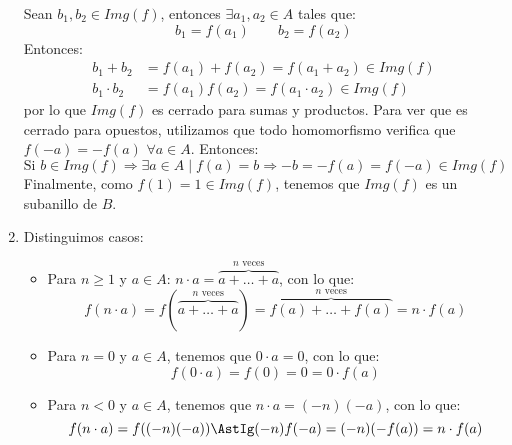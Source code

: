 \documentclass[12pt]{article}
\begin{document}
\begin{ejercicio}[3 puntos]
\begin{enumerate}[label=(\alph*)]
                Sean $b_1,b_2\in Img(f)$, entonces $\exists a_1,a_2 \in A$ tales que:
                \begin{equation*}
                    b_1 = f(a_1) \qquad b_2 = f(a_2)
                \end{equation*}
                Entonces:
                \begin{align*}
                    b_1 + b_2 &= f(a_1) + f(a_2) = f(a_1+a_2) \in Img(f) \\
                    b_1\cdot b_2 &= f(a_1)f(a_2) = f(a_1\cdot a_2) \in Img(f)
                \end{align*}
                por lo que $Img(f)$ es cerrado para sumas y productos. Para ver que es cerrado para opuestos, utilizamos que todo homomorfismo verifica que $f(-a) = -f(a)$ $\forall a\in A$. Entonces:
                \begin{equation*}
                    \text{Si\ } b\in Img(f) \Longrightarrow \exists a\in A \mid f(a) = b \Longrightarrow -b = -f(a) = f(-a) \in Img(f)
                \end{equation*}
                Finalmente, como $f(1)=1 \in Img(f)$, tenemos que $Img(f)$ es un subanillo de $B$.
            \item Distinguimos casos:
                \begin{itemize}
                    \item Para $n\geq 1$ y $a\in A$: $n\cdot a = \overbrace{a+ \ldots +a }^{n \text{\ veces}} $, con lo que:
                        \begin{equation*}
                            f(n\cdot a) = f( \overbrace{a+\ldots+a}^{n \text{\ veces}} ) =  \overbrace{f(a)+\ldots+f(a)}^{n \text{\ veces}}  = n\cdot f(a)
                        \end{equation*}
                    \item Para $n=0$ y $a\in A$, tenemos que $0\cdot a = 0$, con lo que:
                        \begin{equation*}
                            f(0\cdot a) = f(0) = 0 = 0\cdot f(a)
                        \end{equation*}
                    \item Para $n<0$ y $a\in A$, tenemos que $n\cdot a = (-n)(-a)$, con lo que:
                        \begin{equation*}
                            f(n\cdot a) = f((-n)(-a)) \AstIg (-n)f(-a) = (-n)(-f(a)) = n\cdot f(a)
                        \end{equation*}

\end{itemize}
\end{enumerate}
\end{ejercicio}
\end{document}
